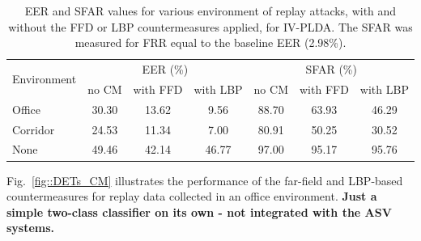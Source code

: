 \begin{table}
\renewcommand{\arraystretch}{1.2}
\begin{center}
    \begin{tabular}{ l || c c c | c c c}
    \hline
 \multirow{2}{*}{Environment}  & \multicolumn{3}{c|}{EER (\%)} & \multicolumn{3}{c}{SFAR (\%)} \\
     	 & no CM & with FFD & with LBP & no CM & with FFD & with LBP\\ 

 \hline \hline
Office   & 30.30 & 13.62 & 9.56 & 88.70 & 63.93 & 46.29\\
Corridor & 24.53 & 11.34 & 7.00 & 80.91 & 50.25 & 30.52\\
None & 49.46 & 42.14 & 46.77 & 97.00 & 95.17 & 95.76\\
\hline
    \end{tabular}
    \caption{EER and SFAR values for various environment of replay attacks, with and without the FFD or LBP countermeasures applied, for IV-PLDA. The SFAR was measured for FRR equal to the baseline EER (2.98\%).}
		\label{tab::results_CM_rooms}
   \end{center}
\end{table}



Fig.~\ref{fig::DETs_CM} illustrates the performance of the far-field and LBP-based countermeasures for replay data collected in an office environment.  {\bfseries Just a simple two-class classifier on its own - not integrated with the ASV systems.}

